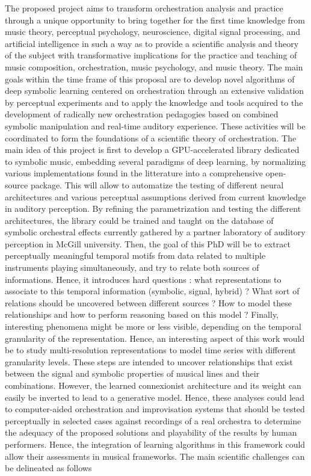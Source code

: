 \documentclass[10pt]{article}
\begin{document}
The proposed project aims to transform orchestration analysis and practice through a unique opportunity to bring together for the first time knowledge from music theory, perceptual psychology, neuroscience, digital signal processing, and artificial intelligence in such a way as to provide a scientific analysis and theory of the subject with transformative implications for the practice and teaching of music composition, orchestration, music psychology, and music theory. The main goals within the time frame of this proposal are to develop novel algorithms of deep symbolic learning centered on orchestration through an extensive validation by perceptual experiments and to apply the knowledge and tools acquired to the development of radically new orchestration pedagogies based on combined symbolic manipulation and real-time auditory experience. These activities will be coordinated to form the foundations of a scientific theory of orchestration. 
The main idea of this project is first to develop a GPU-accelerated library dedicated to symbolic music, embedding several paradigms of deep learning, by normalizing various implementations found in the litterature into a comprehensive open-source package.
This will allow to automatize the testing of different neural architectures and various perceptual assumptions derived from current knowledge in auditory perception. By refining the parametrization and testing the different architectures, the library could be trained and taught on the database of symbolic orchestral effects currently gathered by a partner laboratory of auditory perception in McGill university. Then, the goal of this PhD will be to extract perceptually meaningful temporal motifs from data related to multiple instruments playing simultaneously, and try to relate both sources of informations. Hence, it introduces hard questions : what representations to associate to this temporal information (symbolic, signal, hybrid) ? What sort of relations should be uncovered between different sources ? How to model these relationships and how to perform reasoning based on this model ? Finally, interesting phenomena might be more or less visible, depending on the temporal granularity of the representation. Hence, an interesting aspect of this work would be to study multi-resolution representations to model time series with different granularity levels. These steps are intended to uncover relationships that exist between the signal and symbolic properties of musical lines and their combinations. However, the learned connexionist architecture and its weight can easily be inverted to lead to a generative model. Hence, these analyses could lead to computer-aided orchestration and improvisation systems that should be tested perceptually in selected cases against recordings of a real orchestra to determine the adequacy of the proposed solutions and playability of the results by human performers. Hence, the integration of learning algorithms in this framework could allow their assessments in musical frameworks. The main scientific challenges can be delineated as follows
\end{document}
